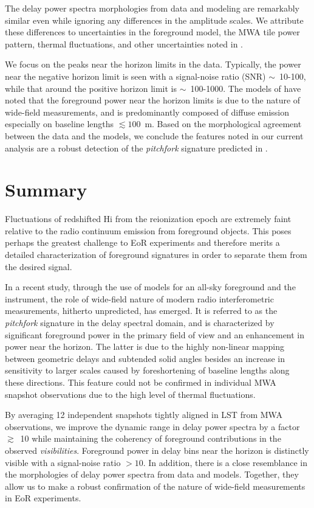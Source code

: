 \documentclass[preprint2,apjl,numberedappendix,twocolappendix,appendixfloats]{emulateapj}
\begin{document}
The delay power spectra morphologies from data and modeling are remarkably similar even while ignoring any differences in the amplitude scales. We attribute these differences to uncertainties in the foreground model, the MWA tile power pattern, thermal fluctuations, and other uncertainties noted in \citet{thy15}. 

We focus on the peaks near the horizon limits in the data. Typically, the power near the negative horizon limit is seen with a signal-noise ratio (SNR) $\sim$~10-100, while that around the positive horizon limit is $\sim$~100-1000. The models of \citet{thy15} have noted that the foreground power near the horizon limits is due to the nature of wide-field measurements, and is predominantly composed of diffuse emission especially on baseline lengths $\lesssim 100$~m. Based on the morphological agreement between the data and the models, we conclude the features noted in our current analysis are a robust detection of the {\it pitchfork} signature predicted in \citet{thy15}.

\section{Summary}\label{sec:summary}

Fluctuations of redshifted H{\sc i} from the reionization epoch are extremely faint relative to the radio continuum emission from foreground objects. This poses perhaps the greatest challenge to EoR experiments and therefore merits a detailed characterization of foreground signatures in order to separate them from the desired signal. 

In a recent study, through the use of models for an all-sky foreground and the instrument, the role of wide-field nature of modern radio interferometric measurements, hitherto unpredicted, has emerged. It is referred to as the {\it pitchfork} signature in the delay spectral domain, and is characterized by significant foreground power in the primary field of view and an enhancement in power near the horizon. The latter is due to the highly non-linear mapping between geometric delays and subtended solid angles besides an increase in sensitivity to larger scales caused by foreshortening of baseline lengths along these directions. This feature could not be confirmed in individual MWA snapshot observations due to the high level of thermal fluctuations. 

By averaging 12 independent snapshots tightly aligned in LST from MWA observations, we improve the dynamic range in delay power spectra by a factor $\gtrsim$~10 while maintaining the coherency of foreground contributions in the observed {\it visibilities}. Foreground power in delay bins near the horizon is distinctly visible with a signal-noise ratio $>10$. In addition, there is a close resemblance in the morphologies of delay power spectra from data and models. Together, they allow us to make a robust confirmation of the nature of wide-field measurements in EoR experiments.
\end{document}
